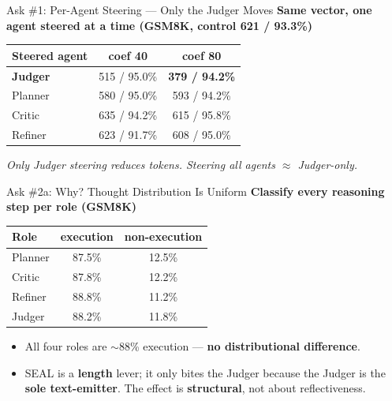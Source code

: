 \documentclass{beamer}
\begin{document}
\begin{frame}{Ask \#1: Per-Agent Steering --- Only the Judger Moves}
    \textbf{Same vector, one agent steered at a time (GSM8K, control 621 / 93.3\%)}
    \begin{table}[]
        \centering\small
        \begin{tabular}{|l|c|c|}
            \hline
            \textbf{Steered agent} & \textbf{coef 40} & \textbf{coef 80} \\ \hline
            \textbf{Judger} & 515 / 95.0\% & \textbf{379 / 94.2\%} \\ \hline
            Planner & 580 / 95.0\% & 593 / 94.2\% \\ \hline
            Critic & 635 / 94.2\% & 615 / 95.8\% \\ \hline
            Refiner & 623 / 91.7\% & 608 / 95.0\% \\ \hline
        \end{tabular}
    \end{table}
    \begin{center}\textit{Only Judger steering reduces tokens. Steering all agents $\approx$ Judger-only.}\end{center}
\end{frame}

\begin{frame}{Ask \#2a: Why? Thought Distribution Is Uniform}
    \textbf{Classify every reasoning step per role (GSM8K)}
    \begin{table}[]
        \centering\small
        \begin{tabular}{|l|c|c|}
            \hline
            \textbf{Role} & \textbf{execution} & \textbf{non-execution} \\ \hline
            Planner & 87.5\% & 12.5\% \\ \hline
            Critic & 87.8\% & 12.2\% \\ \hline
            Refiner & 88.8\% & 11.2\% \\ \hline
            Judger & 88.2\% & 11.8\% \\ \hline
        \end{tabular}
    \end{table}
    \begin{itemize}
        \item All four roles are $\sim$88\% execution --- \textbf{no distributional difference}.
        \item SEAL is a \textbf{length} lever; it only bites the Judger because the Judger is the \textbf{sole text-emitter}. The effect is \textbf{structural}, not about reflectiveness.
    \end{itemize}
\end{frame}
\end{document}
